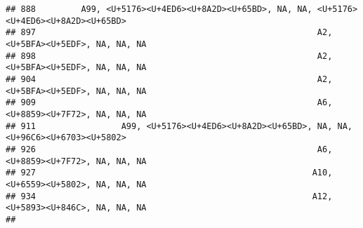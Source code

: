 \documentclass[
]{article}
\begin{document}
\begin{verbatim}
## 888         A99, <U+5176><U+4ED6><U+8A2D><U+65BD>, NA, NA, <U+5176><U+4ED6><U+8A2D><U+65BD>
## 897                                                        A2, <U+5BFA><U+5EDF>, NA, NA, NA
## 898                                                        A2, <U+5BFA><U+5EDF>, NA, NA, NA
## 904                                                        A2, <U+5BFA><U+5EDF>, NA, NA, NA
## 909                                                        A6, <U+8859><U+7F72>, NA, NA, NA
## 911                 A99, <U+5176><U+4ED6><U+8A2D><U+65BD>, NA, NA, <U+96C6><U+6703><U+5802>
## 926                                                        A6, <U+8859><U+7F72>, NA, NA, NA
## 927                                                       A10, <U+6559><U+5802>, NA, NA, NA
## 934                                                       A12, <U+5893><U+846C>, NA, NA, NA
##                                                                                                                                                                                                                                                                                                                                                                                                                                                                                                                                                                                                                                                                                                                                                                                                                                                                                                                                                                                                                                                                                                                                                                                                                                                                                                                                                                                                                                                                                                                                                                                                                                                                                                                                                                                                                                                                                                                                                                                                                                                                                                                                                                                                                                                                                                                                                                                                                                                                                                                                                              
\end{verbatim}
\end{document}
